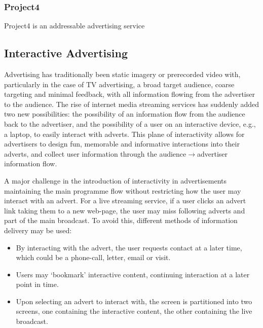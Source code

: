 	\subsubsection{Project4}

	Project4 is an addressable advertising service

	\subsection{Interactive Advertising}

	Advertising has traditionally been static imagery or prerecorded video with, particularly in the case of TV advertising, a broad target audience, coarse targeting and minimal feedback, with all information flowing from the advertiser to the audience. The rise of internet media streaming services has suddenly added two new possibilities: the possibility of an information flow from the audience back to the advertiser, and the possibility of a user on an interactive device, e.g., a laptop, to easily interact with adverts. This plane of interactivity allows for advertisers to design fun, memorable and informative interactions into their adverts, and collect user information through the audience$\rightarrow$advertiser information flow.

	A major challenge in the introduction of interactivity in advertisements maintaining the main programme flow without restricting how the user may interact with an advert. For a live streaming service, if a user clicks an advert link taking them to a new web-page, the user may miss following adverts and part of the main broadcast. To avoid this, different methods of information delivery may be used:
	\begin{itemize}
		\item By interacting with the advert, the user requests contact at a later time, which could be a phone-call, letter, email or visit\citep{integrated-approach-advertising}. 
		\item Users may `bookmark' interactive content, continuing interaction at a later point in time\citep{integrated-approach-advertising}.
		\item Upon selecting an advert to interact with, the screen is partitioned into two screens, one containing the interactive content, the other containing the live broadcast\citep{integrated-approach-advertising}.
	\end{itemize}


